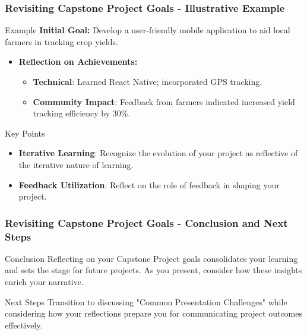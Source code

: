 \documentclass[aspectratio=169]{beamer}
\begin{document}
\begin{frame}[fragile]
    \frametitle{Revisiting Capstone Project Goals - Illustrative Example}
    \begin{block}{Example}
        \textbf{Initial Goal:} Develop a user-friendly mobile application to aid local farmers in tracking crop yields.
    \end{block}
    
    \begin{itemize}
        \item \textbf{Reflection on Achievements:}
        \begin{itemize}
            \item \textbf{Technical}: Learned React Native; incorporated GPS tracking.
            \item \textbf{Community Impact}: Feedback from farmers indicated increased yield tracking efficiency by 30\%.
        \end{itemize}
    \end{itemize}

    \begin{block}{Key Points}
        \begin{itemize}
            \item \textbf{Iterative Learning}: Recognize the evolution of your project as reflective of the iterative nature of learning.
            \item \textbf{Feedback Utilization}: Reflect on the role of feedback in shaping your project.
        \end{itemize}
    \end{block}
\end{frame}

\begin{frame}[fragile]
    \frametitle{Revisiting Capstone Project Goals - Conclusion and Next Steps}
    \begin{block}{Conclusion}
        Reflecting on your Capstone Project goals consolidates your learning and sets the stage for future projects. As you present, consider how these insights enrich your narrative.
    \end{block}
    
    \begin{block}{Next Steps}
        Transition to discussing "Common Presentation Challenges" while considering how your reflections prepare you for communicating project outcomes effectively.
    \end{block}
\end{frame}
\end{document}
